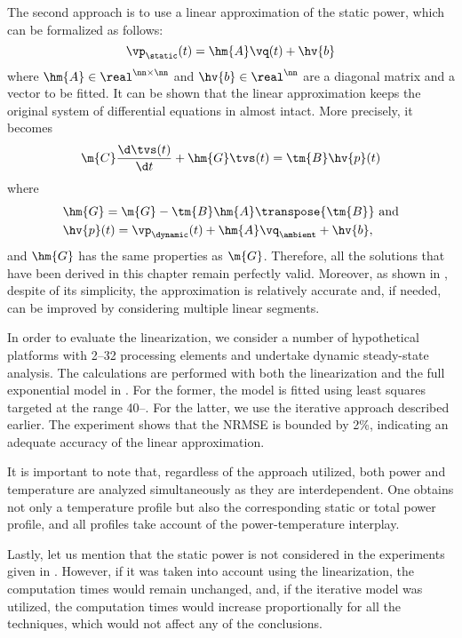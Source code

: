 The second approach is to use a linear approximation of the static power, which
can be formalized as follows:
\[
  \vp_\static(t) = \hm{A} \vq(t) + \hv{b}
\]
where $\hm{A} \in \real^{\nn \times \nn}$ and $\hv{b} \in \real^\nn$ are a
diagonal matrix and a vector to be fitted. It can be shown that the linear
approximation keeps the original system of differential equations in
 almost intact. More precisely, it
becomes
\[
  \m{C} \frac{\d \tvs(t)}{\d t} + \hm{G} \tvs(t) = \tm{B} \hv{p}(t)
\]
where
\begin{align*}
  & \hm{G} = \m{G} - \tm{B} \hm{A} \transpose{\tm{B}} \text{ and} \\
  & \hv{p}(t) = \vp_\dynamic(t) + \hm{A} \vq_\ambient + \hv{b},
\end{align*}
and $\hm{G}$ has the same properties as $\m{G}$. Therefore, all the solutions
that have been derived in this chapter remain perfectly valid. Moreover, as
shown in \cite{liu2007}, despite of its simplicity, the approximation is
relatively accurate and, if needed, can be improved by considering multiple
linear segments.

In order to evaluate the linearization, we consider a number of hypothetical
platforms with 2--32 processing elements and undertake dynamic steady-state
analysis. The calculations are performed with both the linearization and the
full exponential model in . For the former, the model is
fitted using least squares \cite{press2007} targeted at the range
40--. For the latter, we use the iterative approach described
earlier. The experiment shows that the \ac{NRMSE} is bounded by 2\%, indicating
an adequate accuracy of the linear approximation.

It is important to note that, regardless of the approach utilized, both power
and temperature are analyzed simultaneously as they are interdependent. One
obtains not only a temperature profile but also the corresponding static or
total power profile, and all profiles take account of the power-temperature
interplay.

Lastly, let us mention that the static power is not considered in the
experiments given in . However, if it was
taken into account using the linearization, the computation times would remain
unchanged, and, if the iterative model was utilized, the computation times would
increase proportionally for all the techniques, which would not affect any of
the conclusions.
